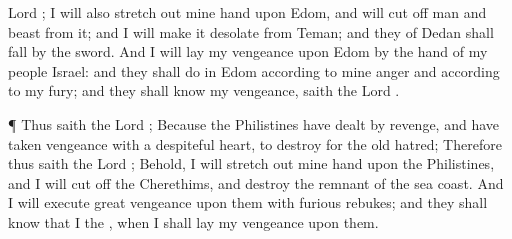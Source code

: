 {Lord
{}; I will also stretch
out mine
hand upon
Edom, and will cut
off
man and
beast from it; and I will
make it
desolate from
Teman; and they of
Dedan shall
fall by the
sword.
And I will
lay my
vengeance upon
Edom by the
hand of my
people
Israel: and they shall
do in
Edom according to mine
anger and according to my
fury; and they shall
know my
vengeance,
saith the
Lord
{}.
\par }{\PP {}¶ Thus
saith the
Lord
{}; Because the
Philistines have
dealt by
revenge, and have
taken
vengeance with a
despiteful
heart, to
destroy
{} for the
old
hatred;
Therefore thus
saith the
Lord
{}; Behold, I will stretch
out mine
hand upon the
Philistines, and I will cut
off the
Cherethims, and
destroy the
remnant of the
sea
coast.
And I will
execute
great
vengeance upon them with
furious
rebukes; and they shall
know that I
{} the
{}, when I shall
lay my
vengeance upon them.

}
